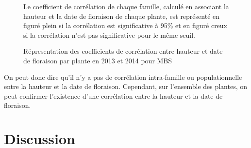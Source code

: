 \documentclass[12pt,a4paper]{article}
\begin{document}
			 				\begin{figure} [!h]
			 					\caption{Répresentation des coefficients de corrélation entre hauteur et date de floraison par plante en 2013 et 2014 pour MBS \label{correlmbs}}
			 					Le coefficient de corrélation de chaque famille, calculé en associant la hauteur et la date de floraison de chaque plante, est représenté en figuré plein si la corrélation est significative à 95\% et en figuré creux si la corrélation n'est pas significative pour le même seuil.
			 				\end{figure}
			 				
			 				On peut donc dire qu'il n'y a pas de corrélation intra-famille ou populationnelle entre la hauteur et la date de floraison. Cependant, sur l'ensemble des plantes, on peut confirmer l'existence d'une corrélation entre la hauteur et la date de floraison.
			 	\section{Discussion}
			 		
\end{document}
